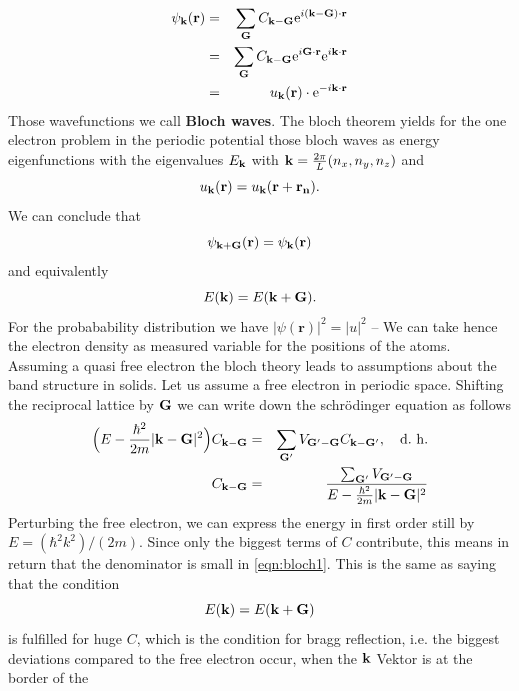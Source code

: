 \begin{eqnarray}
    \psi_{\mathbf{k}}(\mathbf{r})&=& \sum_{\mathbf{G}} C_{\mathbf{k} - \mathbf{G}} \mathrm{e}^{i(\mathbf{k} - \mathbf{G}) \cdot \mathbf{r}} \nonumber \\
            &=& \sum_{\mathbf{G}} C_{\mathbf{k} - \mathbf{G}} \mathrm{e}^{i \mathbf{G} \cdot \mathbf{r}}  \mathrm{e}^{i\mathbf{k} \cdot \mathbf{r}} \nonumber \\
            &=& u_{\mathbf{k}}(\mathbf{r}) \cdot \mathrm{e}^{-i\mathbf{k} \cdot \mathbf{r}} 
\end{eqnarray}
Those wavefunctions we call \textbf{Bloch waves}.
The bloch theorem yields for the one electron problem in the periodic potential those bloch waves 
as energy eigenfunctions with the eigenvalues
$E_{\mathbf{k}}$ with $\mathbf{k} = \frac{2 \pi}{L} (n_x, n_y, n_z)$ and
\begin{equation}
    u_{\mathbf{k}}(\mathbf{r}) = u_{\mathbf{k}}(\mathbf{r + r_n}) .
\end{equation}
We can conclude that
\begin{equation}
    \psi_{\mathbf{k} + \mathbf{G}}(\mathbf{r}) = \psi_{\mathbf{k}}(\mathbf{r}) 
\end{equation}
and equivalently 
\begin{equation}
    E(\mathbf{k}) = E(\mathbf{k} + \mathbf{G}).
\end{equation}
For the probabability distribution we have $|\psi(\mathbf{r})|^2 = |u|^2$ --  
We can take hence the electron density as measured variable for the positions of the atoms.
Assuming a quasi free electron the bloch theory leads to assumptions about the band structure in solids.
Let us assume a free electron in periodic space. Shifting the reciprocal lattice by $\mathbf{G}$ we can
write down the schrödinger equation as follows
\begin{eqnarray}
    \Big(E - \frac{\hbar^2}{2m}|\mathbf{k} - \mathbf{G}|^2\Big) C_{\mathbf{k} - \mathbf{G}} &=&
        \sum_{\mathbf{G}'} V_\mathbf{G' - G} C_{\mathbf{k} - \mathbf{G}'}, \quad \mathrm{d.\ h.} \nonumber \\
    \label{eqn:bloch1}    
    C_{\mathbf{k} - \mathbf{G}} &=& \frac{ \sum_{\mathbf{G}'} V_\mathbf{G' - G}}{E - \frac{\hbar^2}{2m}|\mathbf{k} - \mathbf{G}|^2} 
\end{eqnarray}
Perturbing the free electron, we can express the energy in first order still by
$E = (\hbar^2 k^2) / (2m)$. Since only the biggest terms of $C$ contribute, this
means in return that the denominator is small in \eqref{eqn:bloch1}. This is the same
as saying that the condition
\begin{equation}
    E(\mathbf{k}) = E(\mathbf{k} + \mathbf{G})
\end{equation}
is fulfilled for huge $C$, which is the condition for bragg reflection, i.e. the biggest 
deviations compared to the free electron occur, when the $\mathbf{k}$ Vektor is at the border of the

